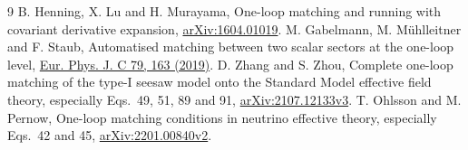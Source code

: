 \documentclass[11pt]{article}
\begin{document}
\begin{thebibliography}{9}
 B. Henning, X. Lu and H. Murayama,
One-loop matching and running with covariant derivative expansion,
\href{https://arxiv.org/abs/1604.01019}{arXiv:1604.01019}.
 M. Gabelmann, M. M\"uhlleitner and F. Staub,
Automatised matching between two scalar sectors at the one-loop level,
\href{https://doi.org/10.1140/epjc/s10052-019-6570-5}{Eur. Phys. J. C 79, 163 (2019)}.
 D. Zhang and S. Zhou,
Complete one-loop matching of the type-I seesaw model onto the Standard
Model effective field theory, especially Eqs.~49, 51, 89 and 91,
\href{https://arxiv.org/html/2107.12133v3}{arXiv:2107.12133v3}.
 T. Ohlsson and M. Pernow,
One-loop matching conditions in neutrino effective theory,
especially Eqs.~42 and 45,
\href{https://arxiv.org/html/2201.00840v2}{arXiv:2201.00840v2}.
\end{thebibliography}
\end{document}
